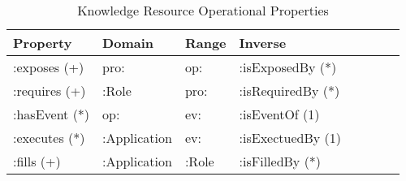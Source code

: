 \documentclass[runningheads]{llncs}
\begin{document}
\begin{table}[h]
\begin{tabular}{|l|l|l|l|l|l|l|l|}
\hline
\textbf{Property}  &\textbf{Domain}  & \textbf{Range}  & \textbf{Inverse}
\\ \hline
:exposes (+)       & pro:            & op:             & :isExposedBy (*)         \\ \hline
:requires (+)      & :Role           & pro:            & :isRequiredBy (*)         \\ \hline
:hasEvent (*)      & op:             & ev:             & :isEventOf  (1)         \\ \hline
:executes (*)      & :Application    & ev:             & :isExectuedBy  (1)         \\ \hline
:fills (+)         & :Application    & :Role           & :isFilledBy  (*)         \\ \hline
\end{tabular}
\caption{Knowledge Resource Operational Properties}
\label{kropprop}
\end{table}
\end{document}
